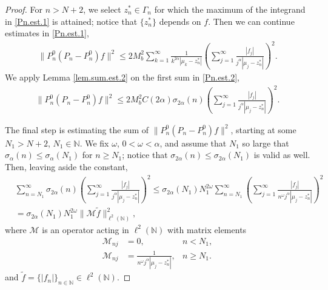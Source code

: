 \begin{proof}
For $n >N +2$, we select $z_n^* \in \Gamma_n$ for which the maximum of the integrand in \eqref{Pn.est.1} is attained; notice that $\{z_n^*\}$ depends on $f$. Then we can continue estimates in \eqref{Pn.est.1},
\begin{equation}\label{Pn.est.2}
\begin{aligned}
\|P_n^0(P_n-P_n^0)f\|^2 
\leq 
2 M_b^2  
\sum_{k=1}^{\infty} \frac{1}{k^{2\alpha}|\mu_k-z_n^*|} 
\left( 
\sum_{j=1}^{\infty} \frac{|f_j|}{j^{\alpha}|\mu_j-z_n^*|}  
\right)^2.
\end{aligned}
\end{equation}
We apply Lemma \ref{lem.sum.est.2} on the first sum in \eqref{Pn.est.2},
\begin{equation*}
\begin{aligned}
\|P_n^0(P_n-P_n^0)f\|^2 
\leq 
2 M_b^2 C(2\alpha) \sigma_{2\alpha}(n)
\left( 
\sum_{j=1}^{\infty} \frac{|f_j|}{j^{\alpha}|\mu_j-z_n^*|}  
\right)^2.
\end{aligned}
\end{equation*}

The final step is estimating the sum of $\|P_n^0(P_n-P_n^0)f\|^2$, starting at some $N_1 > N+2$, $N_1 \in {\mathbb{N}}$. We fix $\omega$, $0< \omega <\alpha$, and assume that $N_1$ so large that $\sigma_{\alpha}(n) \leq \sigma_{\alpha}(N_1)$ for $n \geq N_1$; notice that $\sigma_{2\alpha}(n) \leq \sigma_{2\alpha}(N_1)$ is valid as well.
Then, leaving aside the constant,
\begin{equation*}
\begin{aligned}
&\sum_{n=N_1}^{\infty} 
\sigma_{2\alpha}(n)
\left( 
\sum_{j=1}^{\infty} \frac{|f_j|}{j^{\alpha}|\mu_j-z_n^*|} 
\right)^2
\leq  
\sigma_{2\alpha}(N_1) N_1^{2\omega} 
\sum_{n= N_1}^{\infty} 
\left( 
\sum_{j=1}^{\infty} \frac{|f_j|}{n^{\omega}j^{\alpha}|\mu_j-z_n^*|} 
\right)^2
\\
&
=
\sigma_{2\alpha}(N_1) N_1^{2\omega} 
\|\mathcal{M} \tilde{f}\|^2_{\ell^2({\mathbb{N}})}
,
\end{aligned}
\end{equation*}
where $\mathcal{M}$ is an operator acting in $\ell^2({\mathbb{N}})$ with matrix elements 
\begin{equation*}
\begin{aligned}
\mathcal{M}_{nj}&= 0, & n < N_1, \\
\mathcal{M}_{nj}&=
\frac{1}{n^{\omega}j^{\alpha}|\mu_j-z_n^*|}, & n \geq N_1.
\end{aligned}
\end{equation*}
and $\tilde{f}=\{|f_n|\}_{n\in{\mathbb{N}}} \in \ell^2({\mathbb{N}})$.


\end{proof}
